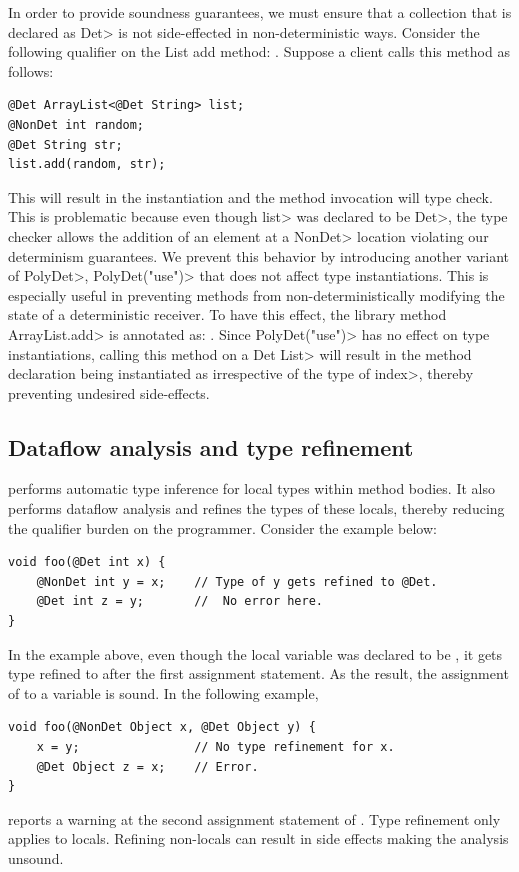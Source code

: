 In order to provide soundness guarantees, we must ensure that a collection that is
declared as \<Det> is not side-effected in non-deterministic ways. Consider the following qualifier 
on the List add method: .
Suppose a client calls this method as follows:
\begin{verbatim}
@Det ArrayList<@Det String> list;
@NonDet int random;
@Det String str;
list.add(random, str);
\end{verbatim}
This will result in the instantiation  and
the method invocation will type check. This is problematic because even though \<list> was declared to be \<Det>,
the type checker allows the addition of an element at a \<NonDet> location violating our determinism guarantees.
We prevent this behavior by introducing another variant of \<PolyDet>, \<PolyDet("use")> that does not affect
type instantiations. This is especially useful in preventing methods from non-deterministically modifying the state
of a deterministic receiver. To have this effect, the library method \<ArrayList.add> is annotated as:
.
Since \<PolyDet("use")> has no effect on type instantiations, calling this method on a \<Det List>
will result in the method declaration being instantiated as 
irrespective of the type of \<index>, thereby preventing undesired side-effects.


\subsection{Dataflow analysis and type refinement}\label{dataflow}
\TheDeterminismChecker performs automatic type inference for local types within method bodies.
It also performs dataflow analysis and refines the types of these locals, thereby reducing the qualifier burden 
on the programmer. Consider the example below:
\begin{verbatim}
void foo(@Det int x) {
    @NonDet int y = x;    // Type of y gets refined to @Det.
    @Det int z = y;       //  No error here.
}
\end{verbatim}
In the example above, even though the local variable  was declared to be , it gets
type refined to  after the first assignment statement. As the result, the assignment of 
to a  variable  is sound. In the following example,
\begin{verbatim}
void foo(@NonDet Object x, @Det Object y) {
    x = y;                // No type refinement for x.
    @Det Object z = x;    // Error.
}
\end{verbatim}
\theDeterminismChecker reports a warning at the second assignment statement of . Type refinement only applies to locals. Refining non-locals can result in side effects making the analysis unsound.

